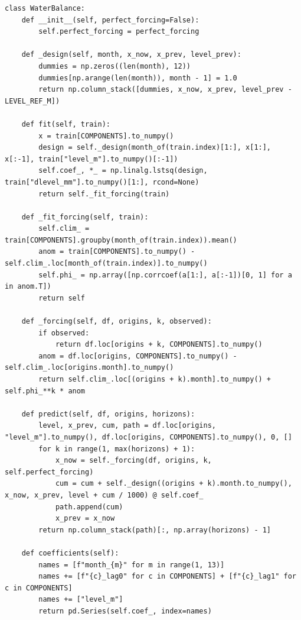 \documentclass{article}
\begin{document}
\begin{lstlisting}[caption={Water-balance model}]
class WaterBalance:
    def __init__(self, perfect_forcing=False):
        self.perfect_forcing = perfect_forcing

    def _design(self, month, x_now, x_prev, level_prev):
        dummies = np.zeros((len(month), 12))
        dummies[np.arange(len(month)), month - 1] = 1.0
        return np.column_stack([dummies, x_now, x_prev, level_prev - LEVEL_REF_M])

    def fit(self, train):
        x = train[COMPONENTS].to_numpy()
        design = self._design(month_of(train.index)[1:], x[1:], x[:-1], train["level_m"].to_numpy()[:-1])
        self.coef_, *_ = np.linalg.lstsq(design, train["dlevel_mm"].to_numpy()[1:], rcond=None)
        return self._fit_forcing(train)

    def _fit_forcing(self, train):
        self.clim_ = train[COMPONENTS].groupby(month_of(train.index)).mean()
        anom = train[COMPONENTS].to_numpy() - self.clim_.loc[month_of(train.index)].to_numpy()
        self.phi_ = np.array([np.corrcoef(a[1:], a[:-1])[0, 1] for a in anom.T])
        return self

    def _forcing(self, df, origins, k, observed):
        if observed:
            return df.loc[origins + k, COMPONENTS].to_numpy()
        anom = df.loc[origins, COMPONENTS].to_numpy() - self.clim_.loc[origins.month].to_numpy()
        return self.clim_.loc[(origins + k).month].to_numpy() + self.phi_**k * anom

    def predict(self, df, origins, horizons):
        level, x_prev, cum, path = df.loc[origins, "level_m"].to_numpy(), df.loc[origins, COMPONENTS].to_numpy(), 0, []
        for k in range(1, max(horizons) + 1):
            x_now = self._forcing(df, origins, k, self.perfect_forcing)
            cum = cum + self._design((origins + k).month.to_numpy(), x_now, x_prev, level + cum / 1000) @ self.coef_
            path.append(cum)
            x_prev = x_now
        return np.column_stack(path)[:, np.array(horizons) - 1]

    def coefficients(self):
        names = [f"month_{m}" for m in range(1, 13)]
        names += [f"{c}_lag0" for c in COMPONENTS] + [f"{c}_lag1" for c in COMPONENTS]
        names += ["level_m"]
        return pd.Series(self.coef_, index=names)
\end{lstlisting}
\end{document}
